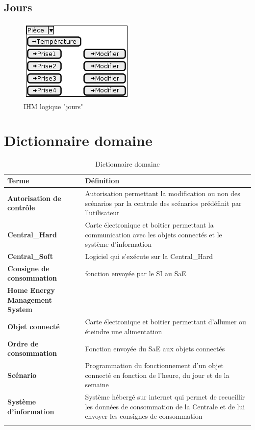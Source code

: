 \documentclass[10pt,a4paper]{report}
\renewcommand{\arraystretch}{1.2}
\begin{document}
		\section{Jours}

\begin{figure}[H]
	\centering
	\includegraphics[scale=0.55]{Jours}
	\caption{IHM logique "jours"}
	\label{ihmLogiqueJours}
\end{figure}

	\chapter{Dictionnaire domaine}
	
{
\renewcommand{\arraystretch}{1.2}		
\begin{longtable}{| l | p{11cm} |}
	\hline
	\textbf{Terme} & Définition\tabularnewline
	\hline
	\textbf{Autorisation de contrôle} & Autorisation permettant la modification ou non des scénarios par la centrale des scénarios prédéfinit par l'utilisateur\tabularnewline
	\hline
	\textbf{Central\_Hard} & Carte électronique et boitier permettant la communication avec les objets connectés et le système d'information\tabularnewline
	\hline
	\textbf{Central\_Soft} & Logiciel qui s'exécute sur la Central\_Hard \tabularnewline
	\hline
	\textbf{Consigne de consommation} & fonction envoyée par le SI au SaE\tabularnewline
	\hline
	\textbf{Home Energy Management System} &  \tabularnewline%
	\hline
	\textbf{Objet connecté} & Carte électronique et boitier permettant d'allumer ou éteindre une alimentation \tabularnewline %
	\hline
	\textbf{Ordre de consommation} & Fonction envoyée du SaE aux objets connectés\tabularnewline
	\hline
	\textbf{Scénario} & Programmation du fonctionnement d'un objet connecté en fonction de l'heure, du jour et de la semaine\tabularnewline
	\hline
	\textbf{Système d'information} & Système hébergé sur internet qui permet de recueillir les données de consommation de la Centrale et de lui envoyer les consignes de consommation\tabularnewline
	\hline
\caption{Dictionnaire domaine}
\label{dicoDomaine}
\end{longtable}
}


	

\tableofcontents
\listoffigures
\listoftables
\end{document}
